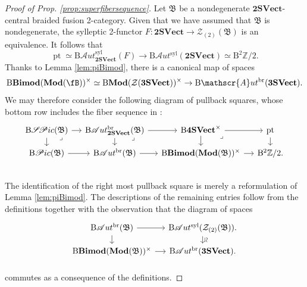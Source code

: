\documentclass[11pt,reqno]{amsart}
\DeclareMathOperator{\pt}{pt}
\newcommand{\Z}{\mathbb{Z}}
\newcommand{\sAut}{\mathscr{A}ut}
\newcommand{\rB}{\mathrm{B}}
\numberwithin{equation}{section}
\theoremstyle{plain}
\theoremstyle{definition}
\begin{document}
\begin{proof}[Proof of Prop. \ref{prop:superfibersequence}]
Let $\mathfrak{B}$ be a nondegenerate $\mathbf{2SVect}$-central braided fusion 2-category. Given that we have assumed that $\mathfrak{B}$ is nondegenerate, the sylleptic 2-functor $F:\mathbf{2SVect}\rightarrow\mathcal{Z}_{(2)}(\mathfrak{B})$ is an equivalence. It follows that
$$\pt\simeq\rB\sAut^{\mathrm{syl}}_{\mathbf{2SVect}}(F)\rightarrow \rB\sAut^{\mathrm{syl}}(\mathbf{2SVect})\simeq \rB^2\mathbb{Z}/2.$$
Thanks to Lemma \ref{lem:piBimod}, there is a canonical map of spaces
$$\rB\mathbf{Bimod}(\mathbf{Mod}(\fB))^{\times}\simeq \rB\mathbf{Mod}(\mathcal{Z}(\mathbf{3SVect}))^{\times}\rightarrow\rB\sAut^{\mathrm{br}}(\mathbf{3SVect}).$$
We may therefore consider the following diagram of pullback squares, whose bottom row includes the fiber sequence in :
\begin{equation}\label{eq:pullbackfibersequences}
    \begin{tikzcd}[sep=small]
    {\mathrm{B}\mathscr{S}\!\mathscr{P}ic(\mathfrak{B})} & {\rB \mathscr{A}ut^{\mathrm{br}}_{\mathbf{2SVect}}(\mathfrak{B})} & {\rB \mathbf{4SVect}^{\times}} & {\mathrm{pt}} \\
	{\mathrm{B}\mathscr{P}ic(\mathfrak{B})} & {\mathrm{B}\mathscr{A}ut^{\mathrm{br}}(\mathfrak{B})} & {\mathrm{B}\mathbf{Bimod}(\mathbf{Mod}(\mathfrak{B}))^{\times}} & {\mathrm{B}^2\Z/2}. \\
	& {} & {}
	\arrow[from=1-1, to=1-2]
	\arrow[from=1-1, to=2-1]
	\arrow["\lrcorner"{anchor=center, pos=0.025}, draw=none, from=1-1, to=3-2]
	\arrow[from=1-2, to=1-3]
	\arrow[from=1-2, to=2-2]
	\arrow["\lrcorner"{anchor=center, pos=0.025}, draw=none, from=1-2, to=3-3]
	\arrow[from=1-3, to=1-4]
	\arrow[from=1-3, to=2-3]
	\arrow["\lrcorner"{anchor=center, pos=0.125}, draw=none, from=1-3, to=2-4]
	\arrow[from=1-4, to=2-4]
	\arrow[from=2-1, to=2-2]
	\arrow[from=2-2, to=2-3]
	\arrow[from=2-3, to=2-4]
\end{tikzcd}
\end{equation}
The identification of the right most pullback square is merely a reformulation of Lemma \ref{lem:piBimod}.
The descriptions of the remaining entries follow from the definitions together with the observation that the diagram of spaces
$$
\begin{tikzcd}[sep=small]
{\mathrm{B}\sAut^{\mathrm{br}}(\mathfrak{B})}\arrow[r]\arrow[d] & {\mathrm{B}\sAut^{\mathrm{syl}}(\mathcal{Z}_{(2)}(\mathfrak{B}))}\arrow[d, "\rotatebox{270}{$\simeq$}"]. \\
{\mathrm{B}\mathbf{Bimod}(\mathbf{Mod}(\mathfrak{B}))^{\times}}\arrow[r] & {\mathrm{B}\sAut^{\mathrm{br}}(\mathbf{3SVect})}.\\
\end{tikzcd}
$$
commutes as a consequence of the definitions.
\end{proof}
\end{document}
